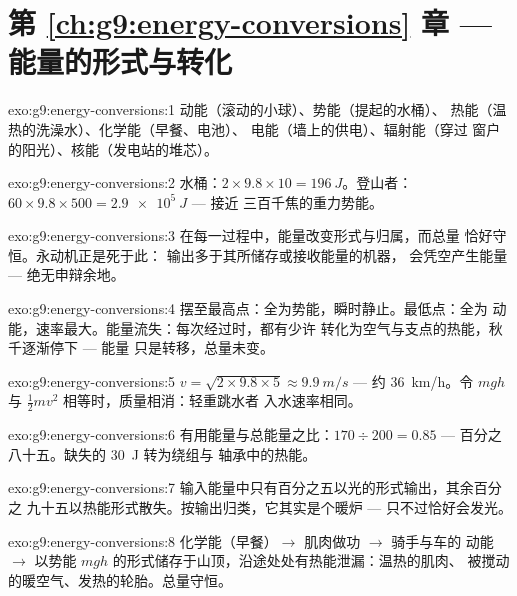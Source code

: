 \section*{第 \ref{ch:g9:energy-conversions} 章 --- 能量的形式与转化}

\begin{solution}{exo:g9:energy-conversions:1}
动能（滚动的小球）、势能（提起的水桶）、
热能（温热的洗澡水）、化学能（早餐、电池）、
电能（墙上的供电）、辐射能（穿过
窗户的阳光）、核能（发电站的堆芯）。
\end{solution}

\begin{solution}{exo:g9:energy-conversions:2}
水桶：$2 \times 9.8 \times 10 = \qty{196}{J}$。登山者：$60
\times 9.8 \times 500 = \qty{2.9e5}{J}$ --- 接近
三百千焦的重力势能。
\end{solution}

\begin{solution}{exo:g9:energy-conversions:3}
在每一过程中，能量改变形式与归属，而总量
恰好守恒。永动机正是死于此：
输出多于其所储存或接收能量的机器，
会凭空产生能量 --- 绝无申辩余地。
\end{solution}

\begin{solution}{exo:g9:energy-conversions:4}
摆至最高点：全为势能，瞬时静止。最低点：全为
动能，速率最大。能量流失：每次经过时，都有少许
转化为空气与支点的热能，秋千逐渐停下 --- 能量
只是转移，总量未变。
\end{solution}

\begin{solution}{exo:g9:energy-conversions:5}
$v = \sqrt{2 \times 9.8 \times 5} \approx \qty{9.9}{m/s}$ ---
约 \qty{36}{km/h}。令 $m g h$ 与
$\frac12 m v^2$ 相等时，质量相消：轻重跳水者
入水速率相同。
\end{solution}

\begin{solution}{exo:g9:energy-conversions:6}
有用能量与总能量之比：$170 \div 200 = 0.85$ --- 百分之
八十五。缺失的 \qty{30}{J} 转为绕组与
轴承中的热能。
\end{solution}

\begin{solution}{exo:g9:energy-conversions:7}
输入能量中只有百分之五以光的形式输出，其余百分之
九十五以热能形式散失。按输出归类，它其实是个暖炉 ---
只不过恰好会发光。
\end{solution}

\begin{solution}{exo:g9:energy-conversions:8}
化学能（早餐）$\to$ 肌肉做功 $\to$ 骑手与车的
动能 $\to$ 以势能 $m g
h$ 的形式储存于山顶，沿途处处有热能泄漏：温热的肌肉、
被搅动的暖空气、发热的轮胎。总量守恒。
\end{solution}

